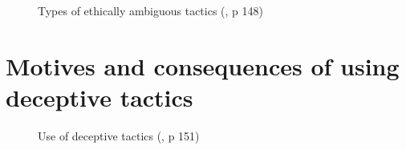 \documentclass[
  ignorenonframetext,
]{beamer}
\begin{document}
\begin{frame}{}
\label{section-6}
\begin{figure}


\caption{\label{fig-types-ethically-ambiguous-tactics}Types of ethically
ambiguous tactics (, p 148)}

\end{figure}%
\end{frame}

\section{Motives and consequences of using deceptive
tactics}\label{motives-and-consequences-of-using-deceptive-tactics}

\begin{frame}{}
\label{section-7}
\begin{figure}


\caption{\label{fig-use-of-deceptive-tactics}Use of deceptive tactics
(, p 151)}

\end{figure}%
\end{frame}
\end{document}
